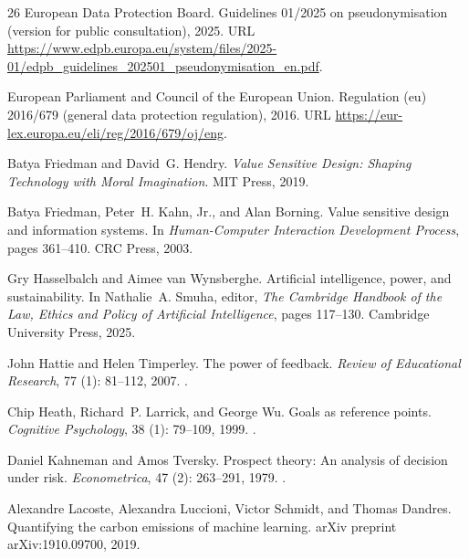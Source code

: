 \documentclass[11pt,a4paper]{article}
\begin{document}
\begin{thebibliography}{26}
{European Data Protection Board}.
\newblock Guidelines 01/2025 on pseudonymisation (version for public
  consultation), 2025.
\newblock URL
  \url{https://www.edpb.europa.eu/system/files/2025-01/edpb_guidelines_202501_pseudonymisation_en.pdf}.

{European Parliament and Council of the European Union}.
\newblock Regulation (eu) 2016/679 (general data protection regulation), 2016.
\newblock URL \url{https://eur-lex.europa.eu/eli/reg/2016/679/oj/eng}.

Batya Friedman and David~G. Hendry.
\newblock \emph{Value Sensitive Design: Shaping Technology with Moral
  Imagination}.
\newblock MIT Press, 2019.

Batya Friedman, Peter~H. Kahn, Jr., and Alan Borning.
\newblock Value sensitive design and information systems.
\newblock In \emph{Human-Computer Interaction Development Process}, pages
  361--410. CRC Press, 2003.

Gry Hasselbalch and Aimee van Wynsberghe.
\newblock Artificial intelligence, power, and sustainability.
\newblock In Nathalie~A. Smuha, editor, \emph{The Cambridge Handbook of the
  Law, Ethics and Policy of Artificial Intelligence}, pages 117--130. Cambridge
  University Press, 2025.

John Hattie and Helen Timperley.
\newblock The power of feedback.
\newblock \emph{Review of Educational Research}, 77 (1):
  81--112, 2007.
\newblock {}.

Chip Heath, Richard~P. Larrick, and George Wu.
\newblock Goals as reference points.
\newblock \emph{Cognitive Psychology}, 38 (1): 79--109, 1999.
\newblock {}.

Daniel Kahneman and Amos Tversky.
\newblock Prospect theory: An analysis of decision under risk.
\newblock \emph{Econometrica}, 47 (2): 263--291, 1979.
\newblock {}.

Alexandre Lacoste, Alexandra Luccioni, Victor Schmidt, and Thomas Dandres.
\newblock Quantifying the carbon emissions of machine learning.
\newblock arXiv preprint arXiv:1910.09700, 2019.


\end{thebibliography}
\end{document}
